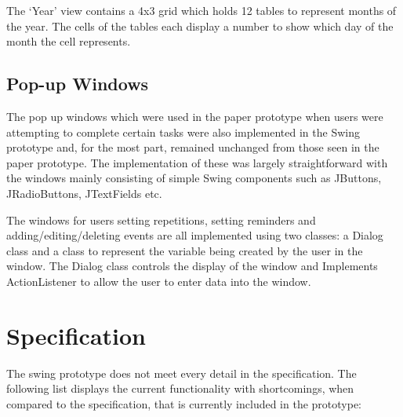 \documentclass{article}
\begin{document}
The `Year' view contains a 4x3 grid which holds 12 tables to represent
months of the year. The cells of the tables each display a number to
show which day of the month the cell represents.

\subsection{Pop-up Windows}

The pop up windows which were used in the paper prototype when users
were attempting to complete certain tasks were also implemented in the
Swing prototype and, for the most part, remained unchanged from those
seen in the paper prototype. The implementation of these was largely
straightforward with the windows mainly consisting of simple Swing
components such as JButtons, JRadioButtons, JTextFields etc.

The windows for users setting repetitions, setting reminders and
adding/editing/deleting events are all implemented using two classes: a
Dialog class and a class to represent the variable being created by the
user in the window. The Dialog class controls the display of the window
and Implements ActionListener to allow the user to enter data into the
window.


\section{Specification}

The swing prototype does not meet every detail in the specification.
The following list displays the current functionality with shortcomings,
when compared to the specification, that is currently included in the
prototype:
\end{document}
